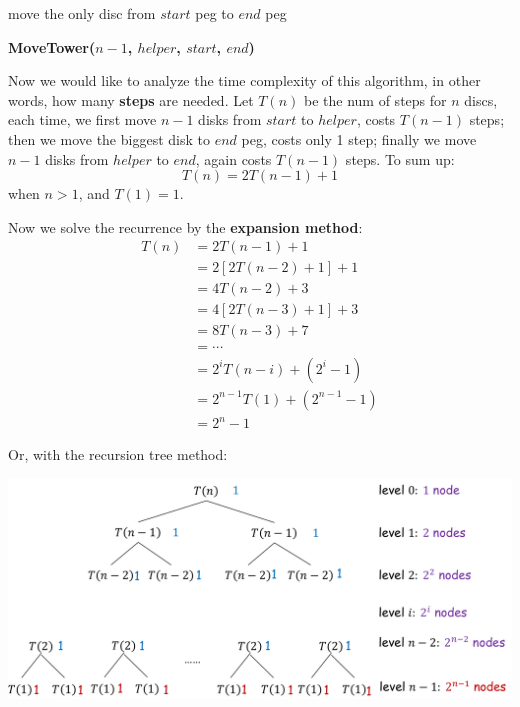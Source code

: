 \begin{spacing}{1.3}
\begin{algorithm}[H]
{            move the only disc from $start$ peg to $end$ peg

            {}
            {}
            {\bf MoveTower($n-1$, $helper$, $start$, $end$)}
        }
    \end{algorithm}

    Now we would like to analyze the time complexity of this algorithm,
    in other words, how many {\bf steps} are needed.
    Let $T(n)$ be the num of steps for $n$ discs, each time, 
    we first move $n-1$ disks from $start$ to $helper$, 
    costs $T(n-1)$ steps; then we move the biggest disk to $end$ peg,
    costs only 1 step; finally we move $n-1$ disks from $helper$
    to $end$, again costs $T(n-1)$ steps. To sum up:
    $$T(n)=2T(n-1)+1$$ when $n>1$, and $T(1)=1$.

    Now we solve the recurrence by the {\bf expansion method}:
    \begin{align*}
        T(n) &= 2T(n-1) + 1\\
             &= 2[2T(n-2)+1] + 1\\
             &= 4T(n-2)+3\\
             &= 4[2T(n-3)+1] + 3 \\
             &= 8T(n-3) + 7\\
             &= \cdots \\
             &= 2^i T(n-i) + (2^i-1)\\
             &= 2^{n-1} T(1) + (2^{n-1}-1)\\
             &= 2^n-1
    \end{align*}

    Or, with the recursion tree method:
    \begin{center}
        \includegraphics[scale=0.2]{images/02-hanoi-tree.jpeg}
    \end{center}
    

\end{spacing}
